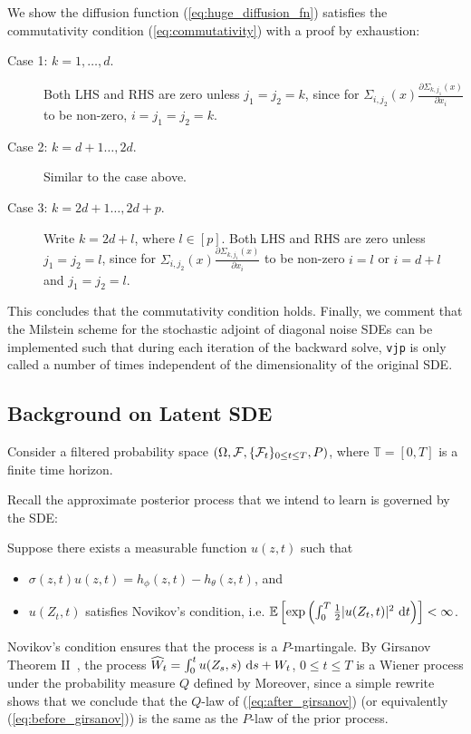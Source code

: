 \documentclass[twoside]{article}
\begin{document}
We show the diffusion function (\ref{eq:huge_diffusion_fn}) satisfies the commutativity condition (\ref{eq:commutativity}) with a proof by exhaustion:
\begin{description}
    \item[Case 1: $k = 1, \dots, d$.] 
        Both LHS and RHS are zero unless $j_1 = j_2 = k$, since for $\Sigma_{i, j_2} (x) \frac{\partial \Sigma_{k, j_1} (x)}{\partial x_i}$ to be non-zero, $i = j_1 = j_2 = k$.
    \item[Case 2: $k = d+1 \dots, 2d$.]
        Similar to the case above. 
    \item[Case 3: $k = 2d+1 \dots, 2d + p$.] 
        Write $k = 2d + l$, where $l \in [p]$. Both LHS and RHS are zero unless $j_1 = j_2 = l$, since for $\Sigma_{i, j_2} (x) \frac{\partial \Sigma_{k, j_1} (x)}{\partial x_i}$ to be non-zero $i = l$ or $i= d + l$ and $j_1 = j_2 = l$.
\end{description}
This concludes that the commutativity condition holds.
Finally, we comment that the Milstein scheme for the stochastic adjoint of diagonal noise SDEs can be implemented such that during each iteration of the backward solve, \texttt{vjp} is only called a number of times independent of the dimensionality of the original SDE. 
 \subsection{Background on Latent SDE} \label{app:latent_sde_bg}
Consider a filtered probability space $(\Omega, \mathcal{F}, \{\mathcal{F}_t\}_{0 \leq t \leq T}, P)$, where $\mathbb{T} = [0, T]$ is a finite time horizon.


Recall the approximate posterior process that we intend to learn is governed by the SDE:

Suppose there exists a measurable function $u(z, t)$ such that 
\begin{itemize}
    \item $\sigma(z, t) u(z, t) = h_\phi(z, t) - h_\theta(z, t)$, and
    \item $u(Z_t, t)$ satisfies Novikov's condition, i.e. 
            $\mathbb{E} \left[  \exp \left( \int_0^T \frac{1}{2} |u(Z_t, t)|^2 \,\mathop{\mathrm{d}\!} t \right)  \right] < \infty$.
\end{itemize}
Novikov's condition ensures that the process
is a $P$-martingale. By Girsanov Theorem II~\cite[Theorem 8.6.4]{oksendal2013stochastic}, the process
$\widehat{W}_t = \int_0^t u(Z_s, s) \,\mathop{\mathrm{d}\!} s + W_t$, $0 \leq t \leq T$ is a Wiener process under the probability measure $Q$ defined by 
Moreover, since a simple rewrite shows that 
we conclude that the $Q$-law of (\ref{eq:after_girsanov}) (or equivalently (\ref{eq:before_girsanov})) is the same as the $P$-law of the prior process. 
\end{document}
